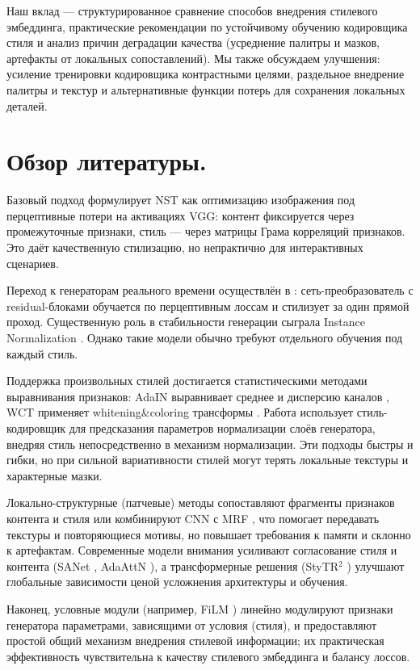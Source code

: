 \documentclass{article}
\begin{document}
Наш вклад — структурированное сравнение способов внедрения стилевого эмбеддинга, практические рекомендации по устойчивому обучению кодировщика стиля и анализ причин деградации качества (усреднение палитры и мазков, артефакты от локальных сопоставлений). Мы также обсуждаем улучшения: усиление тренировки кодировщика контрастными целями, раздельное внедрение палитры и текстур и альтернативные функции потерь для сохранения локальных деталей.

\medskip
\section{Обзор литературы.}
Базовый подход \citet{gatys2015} формулирует NST как оптимизацию изображения под перцептивные потери на активациях VGG: контент фиксируется через промежуточные признаки, стиль — через матрицы Грама корреляций признаков. Это даёт качественную стилизацию, но непрактично для интерактивных сценариев.

Переход к генераторам реального времени осуществлён в \citet{johnson2016}: сеть-преобразователь с residual-блоками обучается по перцептивным лоссам и стилизует за один прямой проход. Существенную роль в стабильности генерации сыграла Instance Normalization \citep{ulyanov2016instnorm}. Однако такие модели обычно требуют отдельного обучения под каждый стиль.

Поддержка произвольных стилей достигается статистическими методами выравнивания признаков: AdaIN выравнивает среднее и дисперсию каналов \citep{huang2017adain}, WCT применяет whitening\&coloring трансформы \citep{li2017wct}. Работа \citet{ghiasi2017magentanet} использует стиль-кодировщик для предсказания параметров нормализации слоёв генератора, внедряя стиль непосредственно в механизм нормализации. Эти подходы быстры и гибки, но при сильной вариативности стилей могут терять локальные текстуры и характерные мазки.

Локально-структурные (патчевые) методы сопоставляют фрагменты признаков контента и стиля \citep{chen2016fastpatch} или комбинируют CNN с MRF \citep{li2016cnnmrf}, что помогает передавать текстуры и повторяющиеся мотивы, но повышает требования к памяти и склонно к артефактам. Современные модели внимания усиливают согласование стиля и контента (SANet \citep{li2019sanet}, AdaAttN \citep{he2019adaattn}), а трансформерные решения (StyTR$^2$ \citep{xia2022stytr}) улучшают глобальные зависимости ценой усложнения архитектуры и обучения.

Наконец, условные модули (например, FiLM \citep{perez2018film}) линейно модулируют признаки генератора параметрами, зависящими от условия (стиля), и предоставляют простой общий механизм внедрения стилевой информации; их практическая эффективность чувствительна к качеству стилевого эмбеддинга и балансу лоссов.
\end{document}
